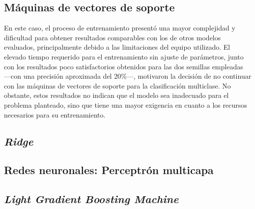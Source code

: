 

\subsection{Máquinas de vectores de soporte}
\label{subsec:svm_multi}

En este caso, el proceso de entrenamiento presentó una mayor complejidad y dificultad para obtener resultados comparables con los de otros modelos evaluados, principalmente debido a las limitaciones del equipo utilizado. El elevado tiempo requerido para el entrenamiento sin ajuste de parámetros, junto con los resultados poco satisfactorios obtenidos para las dos semillas empleadas ---con una precisión aproximada del 20\%---, motivaron la decisión de no continuar con las máquinas de vectores de soporte para la clasificación multiclase. No obstante, estos resultados no indican que el modelo sea inadecuado para el problema planteado, sino que tiene una mayor exigencia en cuanto a los recursos necesarios para su entrenamiento.

\subsection{\textit{Ridge}}
\label{subsec:ridge_multi}



\subsection{Redes neuronales: Perceptrón multicapa}
\label{subsec:mlp_multi}



\subsection{\textit{Light Gradient Boosting Machine}}
\label{subsec:lgbm_multi}

